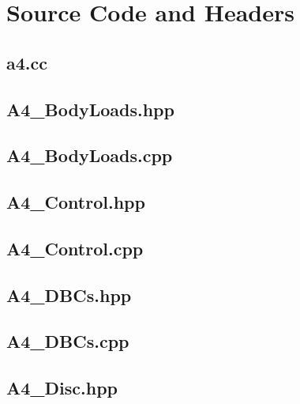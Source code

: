 \documentclass[a4paper, 12pt]{article}
\begin{document}
\newpage
\appendix
\section{Source Code and Headers} \label{sec:code}

\subsection{a4.cc} \label{subsec:a4.cc}


\subsection{A4\_BodyLoads.hpp} \label{subsec:BLhpp}


\subsection{A4\_BodyLoads.cpp} \label{subsec:BLcpp}


\subsection{A4\_Control.hpp} \label{subsec:Cont.hpp}


\subsection{A4\_Control.cpp} \label{subsec:Cont.cpp}


\subsection{A4\_DBCs.hpp} \label{subsec:DBCs.hpp}


\subsection{A4\_DBCs.cpp} \label{subsec:DBCs.cpp}


\subsection{A4\_Disc.hpp} \label{subsec:Disc.hpp}

\end{document}
